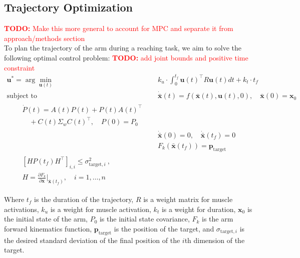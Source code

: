 \documentclass[letterpaper, 10pt, conference]{ieeeconf}
\newcommand{\todo}[1]{\textcolor{red}{\textbf{TODO:} #1}}
\begin{document}
\subsection{Trajectory Optimization}
\todo{Make this more general to account for MPC and separate it from approach/methods section} \\
To plan the trajectory of the arm during a reaching task, we aim to solve the following optimal control problem:
\todo{add joint bounds and positive time constraint} \\
\begin{align}
    \mathbf{u}^* = \arg\min_{\mathbf{u}(t)} &\quad k_u \cdot \int_0^{t_f} \mathbf{u}(t)^\top R \mathbf{u}(t) dt + k_t \cdot t_f \label{eq:cost} \\
    \text{subject to} &\quad \mathbf{\dot{\bar{x}}}(t) = f(\mathbf{\bar{x}}(t), \mathbf{u}(t), 0), \quad \mathbf{\bar{x}}(0) = \mathbf{x}_0 \label{eq:dynamics_constraint} \\
    \begin{split}
    &\quad \dot{P}(t) = A(t)P(t) + P(t)A(t)^\top \\
    &\quad \quad + C(t) \Sigma_w C(t)^\top, \quad P(0) = P_0 
    \end{split}\label{eq:dynamics_constraint_p} \\
    &\quad \mathbf{\dot{\bar{x}}}(0) = 0, \quad \mathbf{\dot{\bar{x}}}(t_f) = 0 \label{eq:boundary_constraints} \\
    &\quad F_k(\mathbf{\bar{x}}(t_f)) = \mathbf{p}_{\text{target}} \label{eq:target_constraint} \\
    \begin{split}
    &\quad [HP(t_f)H^\top]_{i,i} \leq \sigma_{\text{target}, i}^2 \ , \\
    &\quad H = \frac{\partial F_k}{\partial \mathbf{x}}\bigg|_{\mathbf{\bar{x}}(t_f)}, \quad i = 1, \ldots, n 
    \end{split}\label{eq:target_variance_constraint}
\end{align}

Where $t_f$ is the duration of the trajectory, $R$ is a weight matrix for muscle activations, $k_u$ is a weight for muscle activation, $k_t$ is a weight for duration, $\mathbf{x}_0$ is the initial state of the arm, $P_0$ is the initial state covariance, $F_k$ is the arm forward kinematics function, $\mathbf{p}_{\text{target}}$ is the position of the target, and $\sigma_{\text{target}, i}$ is the desired standard deviation of the final position of the $i$th dimension of the target.
\end{document}
